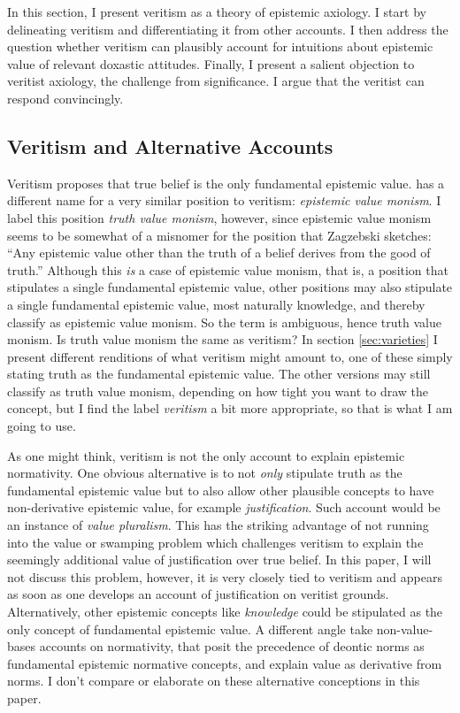 \documentclass[12pt,numbers=noenddot]{scrartcl}
\begin{document}
In this section, I present veritism as a theory of epistemic axiology. I start by delineating veritism and differentiating it from other accounts. I then address the question whether veritism can plausibly account for intuitions about epistemic value of relevant doxastic attitudes. Finally, I present a salient objection to veritist axiology, the challenge from significance. I argue that the veritist can respond convincingly.

\subsection{Veritism and Alternative Accounts}

Veritism proposes that true belief is the only fundamental epistemic value. \textcite[191]{Zagzebski2004-ZAGEVM-2} has a different name for a very similar position to veritism: \emph{epistemic value monism}. I label this position \emph{truth value monism}, however, since epistemic value monism seems to be somewhat of a misnomer for the position that Zagzebski sketches: “Any epistemic value other than the truth of a belief derives from the good of truth.” Although this \emph{is} a case of epistemic value monism, that is, a position that stipulates a single fundamental epistemic value, other positions may also stipulate a single fundamental epistemic value, most naturally knowledge, and thereby classify as epistemic value monism. So the term is ambiguous, hence truth value monism.
Is truth value monism the same as veritism? In section \ref{sec:varieties} I present different renditions of what veritism might amount to, one of these simply stating truth as the fundamental epistemic value. The other versions may still classify as truth value monism, depending on how tight you want to draw the concept, but I find the label \emph{veritism} a bit more appropriate, so that is what I am going to use.

As one might think, veritism is not the only account to explain epistemic normativity. One obvious alternative is to not \emph{only} stipulate truth as the fundamental epistemic value but to also allow other plausible concepts to have non-derivative epistemic value, for example \emph{justification}. Such account would be an instance of \emph{value pluralism}. This has the striking advantage of not running into the value or swamping problem which challenges veritism to explain the seemingly additional value of justification over true belief. In this paper, I will not discuss this problem, however, it is very closely tied to veritism and appears as soon as one develops an account of justification on veritist grounds. Alternatively, other epistemic concepts like \emph{knowledge} could be stipulated as the only concept of fundamental epistemic value. A different angle take non-value-bases accounts on normativity, that posit the precedence of deontic norms as fundamental epistemic normative concepts, and explain value as derivative from norms. I don't compare or elaborate on these alternative conceptions in this paper.
\end{document}
